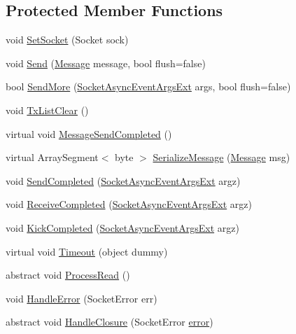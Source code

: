 \subsection*{Protected Member Functions}
\begin{DoxyCompactItemize}
\item 
void \hyperlink{class_o_t_a_1_1_sockets_1_1_connection_a7cfdcd33cfd7020e550285069b28446f}{Set\+Socket} (Socket sock)
\item 
void \hyperlink{class_o_t_a_1_1_sockets_1_1_connection_abd0624cd5b4fdb2a50ecb2cedff68cdf}{Send} (\hyperlink{struct_o_t_a_1_1_sockets_1_1_connection_1_1_message}{Message} message, bool flush=false)
\item 
bool \hyperlink{class_o_t_a_1_1_sockets_1_1_connection_ae9e35e9edef1cb5528bc66c301ce89b7}{Send\+More} (\hyperlink{class_o_t_a_1_1_sockets_1_1_connection_1_1_socket_async_event_args_ext}{Socket\+Async\+Event\+Args\+Ext} args, bool flush=false)
\item 
void \hyperlink{class_o_t_a_1_1_sockets_1_1_connection_adba268b347ea98895900fa53605550f4}{Tx\+List\+Clear} ()
\item 
virtual void \hyperlink{class_o_t_a_1_1_sockets_1_1_connection_a4d49bb3b176bcbaedc0457d17df33462}{Message\+Send\+Completed} ()
\item 
virtual Array\+Segment$<$ byte $>$ \hyperlink{class_o_t_a_1_1_sockets_1_1_connection_ad10d077d13dbd4c72beec8e3fc6d2f05}{Serialize\+Message} (\hyperlink{struct_o_t_a_1_1_sockets_1_1_connection_1_1_message}{Message} msg)
\item 
void \hyperlink{class_o_t_a_1_1_sockets_1_1_connection_aa614173501e8e546d56cfabdb6482b85}{Send\+Completed} (\hyperlink{class_o_t_a_1_1_sockets_1_1_connection_1_1_socket_async_event_args_ext}{Socket\+Async\+Event\+Args\+Ext} argz)
\item 
void \hyperlink{class_o_t_a_1_1_sockets_1_1_connection_a7302dadcbaa0d851dcb9af63ad3fb3ed}{Receive\+Completed} (\hyperlink{class_o_t_a_1_1_sockets_1_1_connection_1_1_socket_async_event_args_ext}{Socket\+Async\+Event\+Args\+Ext} argz)
\item 
void \hyperlink{class_o_t_a_1_1_sockets_1_1_connection_a365d3aba74d0624675df2b23867bd05a}{Kick\+Completed} (\hyperlink{class_o_t_a_1_1_sockets_1_1_connection_1_1_socket_async_event_args_ext}{Socket\+Async\+Event\+Args\+Ext} argz)
\item 
virtual void \hyperlink{class_o_t_a_1_1_sockets_1_1_connection_aae5d97c14b2f9859157f53e57d64ca83}{Timeout} (object dummy)
\item 
abstract void \hyperlink{class_o_t_a_1_1_sockets_1_1_connection_a3b33673044f6e18c1e2364d86846c107}{Process\+Read} ()
\item 
void \hyperlink{class_o_t_a_1_1_sockets_1_1_connection_a51af7f160ba2aa66fb16ad17ea1c53f0}{Handle\+Error} (Socket\+Error err)
\item 
abstract void \hyperlink{class_o_t_a_1_1_sockets_1_1_connection_ae3319eefe2319d9ef50926f156432ac0}{Handle\+Closure} (Socket\+Error \hyperlink{class_o_t_a_1_1_sockets_1_1_connection_a8bc7bc51def4a9f6ad9ff3854dbea338}{error})
\end{DoxyCompactItemize}
